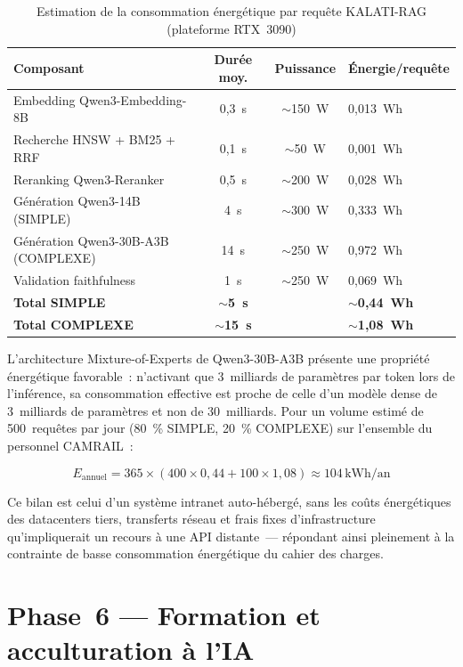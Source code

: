 \documentclass[12pt,a4paper]{report}
\begin{document}
\begin{table}[p]
\centering
\caption{Estimation de la consommation énergétique par requête KALATI-RAG (plateforme RTX~3090)}
\label{tab:energie}
\renewcommand{\arraystretch}{1.4}
\begin{tabularx}{\linewidth}{@{} l c c X @{}}
\toprule
\textbf{Composant} & \textbf{Durée moy.} & \textbf{Puissance} & \textbf{Énergie/requête} \\
\midrule
Embedding Qwen3-Embedding-8B & 0,3~s & $\sim$150~W & 0,013~Wh \\
Recherche HNSW + BM25 + RRF  & 0,1~s & $\sim$50~W  & 0,001~Wh \\
Reranking Qwen3-Reranker      & 0,5~s & $\sim$200~W & 0,028~Wh \\
Génération Qwen3-14B (SIMPLE) & 4~s   & $\sim$300~W & 0,333~Wh \\
Génération Qwen3-30B-A3B (COMPLEXE) & 14~s & $\sim$250~W & 0,972~Wh \\
Validation faithfulness       & 1~s   & $\sim$250~W & 0,069~Wh \\
\midrule
\textbf{Total SIMPLE}   & \textbf{$\sim$5~s}  & & \textbf{$\sim$0,44~Wh} \\
\textbf{Total COMPLEXE} & \textbf{$\sim$15~s} & & \textbf{$\sim$1,08~Wh} \\
\bottomrule
\end{tabularx}
\end{table}

L'architecture Mixture-of-Experts de Qwen3-30B-A3B présente une propriété énergétique
favorable~: n'activant que 3~milliards de paramètres par token lors de l'inférence, sa
consommation effective est proche de celle d'un modèle dense de 3~milliards de paramètres et
non de 30~milliards. Pour un volume estimé de 500~requêtes par jour (80~\% SIMPLE,
20~\% COMPLEXE) sur l'ensemble du personnel CAMRAIL~:

\[
E_{\text{annuel}} = 365 \times (400 \times 0{,}44 + 100 \times 1{,}08) \approx 104\,\text{kWh/an}
\]

Ce bilan est celui d'un système intranet auto-hébergé, sans les coûts énergétiques des
datacenters tiers, transferts réseau et frais fixes d'infrastructure qu'impliquerait un recours
à une API distante~--- répondant ainsi pleinement à la contrainte de basse consommation
énergétique du cahier des charges.

\section{Phase~6 --- Formation et acculturation à l'IA}
\end{document}
